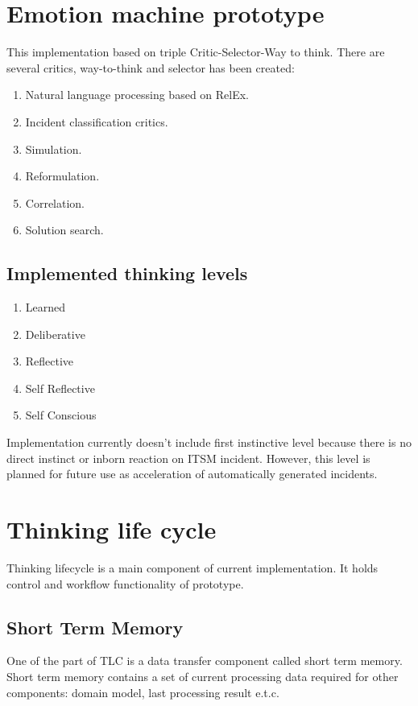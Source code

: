 \documentclass[12pt]{article}
\begin{document}
\section{Emotion machine prototype}
This implementation based on triple Critic-Selector-Way to think. There are several critics, way-to-think and selector has been created:

\begin{enumerate}
 \item Natural language processing based on RelEx.
 \item Incident classification critics.
 \item Simulation.
 \item Reformulation.
 \item Correlation.
 \item Solution search.
\end{enumerate}

\subsection{Implemented thinking levels}

\begin{enumerate}
 \item Learned
 \item Deliberative
 \item Reflective
 \item Self Reflective
 \item Self Conscious
\end{enumerate}

Implementation currently doesn’t include first instinctive level because there is no direct instinct or inborn reaction on ITSM incident. However, this level is planned for future use as acceleration of automatically generated incidents.

\section{Thinking life cycle}

Thinking lifecycle is a main component of current implementation. It holds control and workflow functionality of prototype. 

\subsection{Short Term Memory}
One of the part of TLC is a data transfer component called short term memory. Short term memory contains a set of current processing data required for other components: domain model, last processing result e.t.c.
\end{document}

